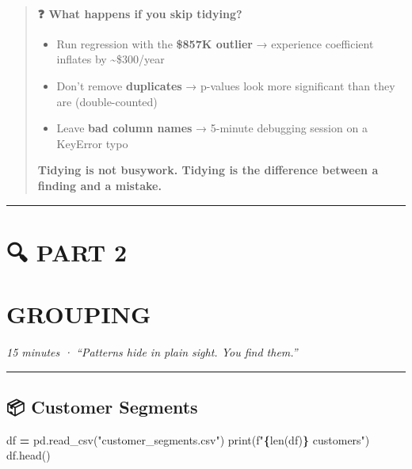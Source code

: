 \documentclass[
]{article}
\newenvironment{Shaded}{\begin{snugshade}}{\end{snugshade}}
\newcommand{\BuiltInTok}[1]{#1}
\newcommand{\NormalTok}[1]{#1}
\newcommand{\OperatorTok}[1]{\textcolor[rgb]{0.81,0.36,0.00}{\textbf{#1}}}
\newcommand{\SpecialCharTok}[1]{\textcolor[rgb]{0.81,0.36,0.00}{\textbf{#1}}}
\newcommand{\SpecialStringTok}[1]{\textcolor[rgb]{0.31,0.60,0.02}{#1}}
\newcommand{\StringTok}[1]{\textcolor[rgb]{0.31,0.60,0.02}{#1}}
\providecommand{\tightlist}{%
  \setlength{\itemsep}{0pt}\setlength{\parskip}{0pt}}
\begin{document}
\begin{quote}
\mbox{}%
\paragraph{❓ What happens if you skip
tidying?}\label{what-happens-if-you-skip-tidying}

\begin{itemize}
\tightlist
\item
  Run regression with the \textbf{\$857K outlier} → experience
  coefficient inflates by \textasciitilde\$300/year
\item
  Don't remove \textbf{duplicates} → p-values look more significant than
  they are (double-counted)
\item
  Leave \textbf{bad column names} → 5-minute debugging session on a
  KeyError typo
\end{itemize}

\textbf{Tidying is not busywork. Tidying is the difference between a
finding and a mistake.}
\end{quote}

\begin{center}\rule{0.5\linewidth}{0.5pt}\end{center}

\section{🔍 PART 2}\label{part-2}

\section{GROUPING}\label{grouping}

\emph{15 minutes · ``Patterns hide in plain sight. You find them.''}

\begin{center}\rule{0.5\linewidth}{0.5pt}\end{center}

\subsection{📦 Customer Segments}\label{customer-segments}

\begin{Shaded}
\begin{Highlighting}[]
\NormalTok{df }\OperatorTok{=}\NormalTok{ pd.read\_csv(}\StringTok{"customer\_segments.csv"}\NormalTok{)}
\BuiltInTok{print}\NormalTok{(}\SpecialStringTok{f"}\SpecialCharTok{\{}\BuiltInTok{len}\NormalTok{(df)}\SpecialCharTok{\}}\SpecialStringTok{ customers"}\NormalTok{)}
\NormalTok{df.head()}
\end{Highlighting}
\end{Shaded}
\end{document}
